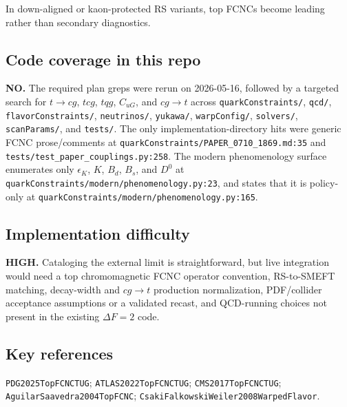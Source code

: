 In down-aligned or kaon-protected RS variants, top FCNCs become leading rather
than secondary diagnostics.

\subsection*{Code coverage in this repo}
\textbf{NO.}  The required plan greps were rerun on 2026-05-16, followed by a
targeted search for \(t\to c g\), \(tcg\), \(tqg\), \(C_{uG}\), and
\(cg\to t\) across \texttt{quarkConstraints/}, \texttt{qcd/},
\texttt{flavorConstraints/}, \texttt{neutrinos/}, \texttt{yukawa/},
\texttt{warpConfig/}, \texttt{solvers/}, \texttt{scanParams/}, and
\texttt{tests/}.  The only implementation-directory hits were generic FCNC
prose/comments at \texttt{quarkConstraints/PAPER\_0710\_1869.md:35} and
\texttt{tests/test\_paper\_couplings.py:258}.  The modern phenomenology surface
enumerates only \(\epsilon_K\), \(K\), \(B_d\), \(B_s\), and \(D^0\) at
\texttt{quarkConstraints/modern/phenomenology.py:23}, and states that it is
policy-only at \texttt{quarkConstraints/modern/phenomenology.py:165}.

\subsection*{Implementation difficulty}
\textbf{HIGH.}  Cataloging the external limit is straightforward, but live
integration would need a top chromomagnetic FCNC operator convention,
RS-to-SMEFT matching, decay-width and \(cg\to t\) production normalization,
PDF/collider acceptance assumptions or a validated recast, and QCD-running
choices not present in the existing \(\Delta F=2\) code.

\subsection*{Key references}
\texttt{PDG2025TopFCNCTUG}; \texttt{ATLAS2022TopFCNCTUG};
\texttt{CMS2017TopFCNCTUG}; \texttt{AguilarSaavedra2004TopFCNC};
\texttt{CsakiFalkowskiWeiler2008WarpedFlavor}.
